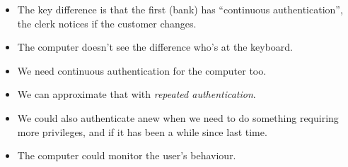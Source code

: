 \begin{frame}
  \begin{remark}
    \begin{itemize}
      \item The key difference is that the first (bank) has \enquote{continuous 
          authentication}, the clerk notices if the customer changes.

      \item The computer doesn't see the difference who's at the keyboard.
      \item We need continuous authentication for the computer too.
    \end{itemize}
  \end{remark}

  \pause

  \begin{solution}
    \begin{itemize}
      \item We can approximate that with \emph{repeated authentication}.

      \item We could also authenticate anew when we need to do something 
        requiring more privileges, and if it has been a while since last time.

      \item The computer could monitor the user's behaviour.
    \end{itemize}
  \end{solution}
\end{frame}




\begin{frame}[allowframebreaks]
	\small
  \printbibliography{}
\end{frame}


